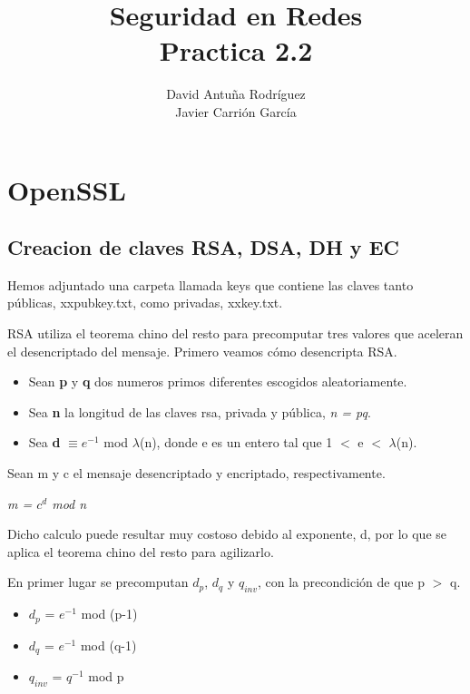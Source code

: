 \documentclass[11pt]{article}
\title{\Large Seguridad en Redes\\Practica 2.2}
\author{David Antuña Rodríguez\\Javier Carrión García}
\date{}
\begin{document}
  \raggedright

  \maketitle
  \newpage

  \section{OpenSSL}
    \subsection{Creacion de claves RSA, DSA, DH y EC}
      \par
      Hemos adjuntado una carpeta llamada keys que contiene las claves tanto públicas,
      xxpubkey.txt, como privadas, xxkey.txt.

      \bigskip
      \par
      RSA utiliza el teorema chino del resto para precomputar tres valores que aceleran el
      desencriptado del mensaje. Primero veamos cómo desencripta RSA.
      \begin{itemize}
        \item Sean \textbf{p} y \textbf{q} dos numeros primos diferentes escogidos aleatoriamente.
        \item Sea \textbf{n} la longitud de las claves rsa, privada y pública, \textit{n = pq}.
        \item Sea \textbf{d} $\equiv e^{-1}$ mod $\lambda$(n), donde e es un entero tal que 1 $<$
          e $<$ $\lambda$(n).
      \end{itemize}
      Sean m y c el mensaje desencriptado y encriptado, respectivamente.
      \begin{center}
        \Large
        \textit{m = $c^d$ mod n}
      \end{center}

      \par
      Dicho calculo puede resultar muy costoso debido al exponente, d, por lo que se aplica el
      teorema chino del resto para agilizarlo.

      \bigskip
      \par
      En primer lugar se precomputan $d_p$, $d_q$ y $q_{inv}$, con la precondición de que p $>$ q.
      \begin{itemize}
        \item $d_p$ = $e^{-1}$ mod (p-1)
        \item $d_q$ = $e^{-1}$ mod (q-1)
        \item $q_{inv}$ = $q^{-1}$ mod p
      \end{itemize}
\end{document}
